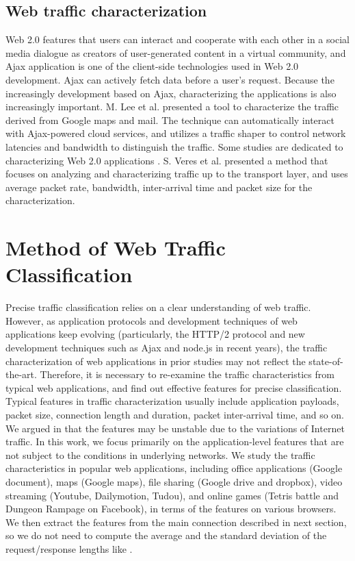 \documentclass[preprint,12pt]{elsarticle}
\begin{document}
\subsection{Web traffic characterization}
\label{sec:web_type}
Web 2.0 features that users can interact and cooperate with each other in a social media dialogue as creators of user-generated content in a virtual community, and Ajax application is one of the client-side technologies used in Web 2.0 development. Ajax can actively fetch data before a user's request. Because the increasingly development based on Ajax, characterizing the applications is also increasingly important. M. Lee et al. presented a tool \cite{AAM10} to characterize the traffic derived from Google maps and mail. The technique can automatically interact with Ajax-powered cloud services, and utilizes a traffic shaper to control network latencies and bandwidth to distinguish the traffic. Some studies are dedicated to characterizing Web 2.0 applications \cite{MTC09, COH08, WTM09}. S. Veres et al. presented a method that focuses on analyzing and characterizing traffic up to the transport layer, and uses average packet rate, bandwidth, inter-arrival time and packet size for the characterization.

\section{Method of Web Traffic Classification}
\label{sec:method}
Precise traffic classification relies on a clear understanding of web traffic. However, as application protocols and development techniques of web applications keep evolving (particularly, the HTTP/2 protocol \cite{HTTP2} and new development techniques such as Ajax and node.js in recent years), the traffic characterization of web applications in prior studies may not reflect the state-of-the-art. Therefore, it is necessary to re-examine the traffic characteristics from typical web applications, and find out effective features for precise classification. Typical features in traffic characterization usually include application payloads, packet size, connection length and duration, packet inter-arrival time, and so on. We argued in \cite{TFT14} that the features may be unstable due to the variations of Internet traffic. In this work, we focus primarily on the application-level features that are not subject to the conditions in underlying networks. We study the traffic characteristics in popular web applications, including office applications (Google document), maps (Google maps), file sharing (Google drive and dropbox), video streaming (Youtube, Dailymotion, Tudou), and online games (Tetris battle and Dungeon Rampage on Facebook), in terms of the features on various browsers. We then extract the features from the main connection described in next section, so we do not need to compute the average and the standard deviation of the request/response lengths like \cite{TFT14}. 
\end{document}
